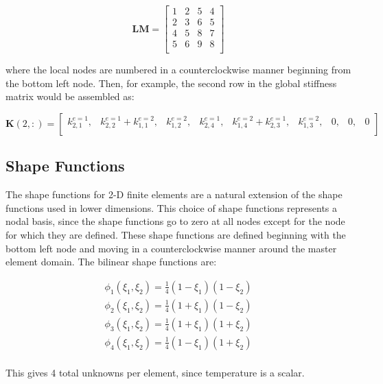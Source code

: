 \documentclass[10pt]{article}
\begin{document}
\begin{equation}
\textbf{LM}=\begin{bmatrix}
1 & 2 & 5 & 4\\
2 & 3 & 6 & 5\\
4 & 5 & 8 & 7\\
5 & 6 & 9 & 8\\
\end{bmatrix}
\end{equation}

where the local nodes are numbered in a counterclockwise manner beginning from the bottom left node. Then, for example, the second row in the global stiffness matrix would be assembled as:

\begin{equation}
\textbf{K}(2,:)=\begin{bmatrix}
k_{2,1}^{e=1}, & k_{2,2}^{e=1}+k_{1,1}^{e=2}, & k_{1,2}^{e=2}, & k_{2,4}^{e=1}, & k_{1,4}^{e=2}+k_{2,3}^{e=1}, & k_{1,3}^{e=2}, & 0, & 0, & 0\\
\end{bmatrix}
\end{equation}

\subsection{Shape Functions}

The shape functions for 2-D finite elements are a natural extension of the shape functions used in lower dimensions. This choice of shape functions represents a nodal basis, since the shape functions go to zero at all nodes except for the node for which they are defined. These shape functions are defined beginning with the bottom left node and moving in a counterclockwise manner around the master element domain. The bilinear shape functions are:

\begin{equation}
\label{eq:Bricks}
\begin{aligned}
\phi_1(\xi_1,\xi_2)=\frac{1}{4}(1-\xi_1)(1-\xi_2)\\
\phi_2(\xi_1,\xi_2)=\frac{1}{4}(1+\xi_1)(1-\xi_2)\\
\phi_3(\xi_1,\xi_2)=\frac{1}{4}(1+\xi_1)(1+\xi_2)\\
\phi_4(\xi_1,\xi_2)=\frac{1}{4}(1-\xi_1)(1+\xi_2)\\
\end{aligned}
\end{equation}

This gives 4 total unknowns per element, since temperature is a scalar.
\end{document}
